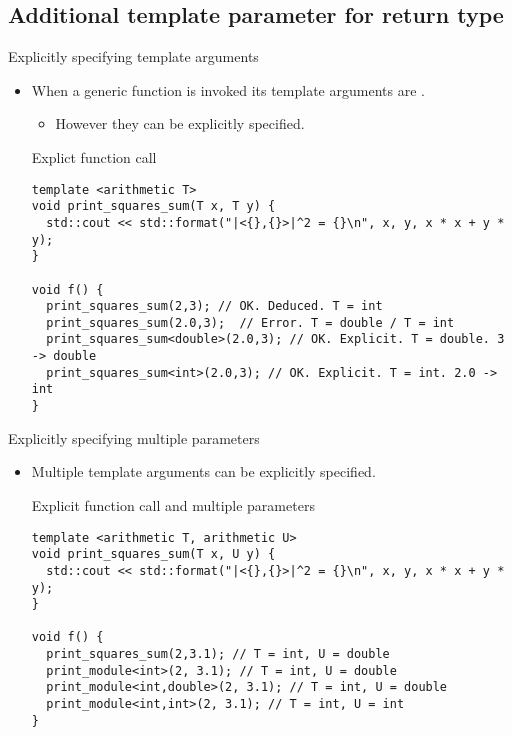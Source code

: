 \subsection{Additional template parameter for return type}

\begin{frame}[t,fragile]{Explicitly specifying template arguments}
\begin{itemize}
  \item When a generic function is invoked its template arguments are .
    \begin{itemize}
      \item However they can be explicitly specified.
    \end{itemize}

\begin{block}{Explict function call}
\begin{lstlisting}
template <arithmetic T>
void print_squares_sum(T x, T y) {
  std::cout << std::format("|<{},{}>|^2 = {}\n", x, y, x * x + y * y);
}

void f() {
  print_squares_sum(2,3); // OK. Deduced. T = int
  print_squares_sum(2.0,3);  // Error. T = double / T = int
  print_squares_sum<double>(2.0,3); // OK. Explicit. T = double. 3 -> double
  print_squares_sum<int>(2.0,3); // OK. Explicit. T = int. 2.0 -> int
}

\end{lstlisting}
\end{block}

\end{itemize}
\end{frame}

\begin{frame}[t,fragile]{Explicitly specifying multiple parameters}
\begin{itemize}
  \item Multiple template arguments can be explicitly specified.

\begin{block}{Explicit function call and multiple parameters}
\begin{lstlisting}
template <arithmetic T, arithmetic U>
void print_squares_sum(T x, U y) {
  std::cout << std::format("|<{},{}>|^2 = {}\n", x, y, x * x + y * y);
}

void f() {
  print_squares_sum(2,3.1); // T = int, U = double
  print_module<int>(2, 3.1); // T = int, U = double
  print_module<int,double>(2, 3.1); // T = int, U = double
  print_module<int,int>(2, 3.1); // T = int, U = int
}
\end{lstlisting}
\end{block}

\end{itemize}
\end{frame}

